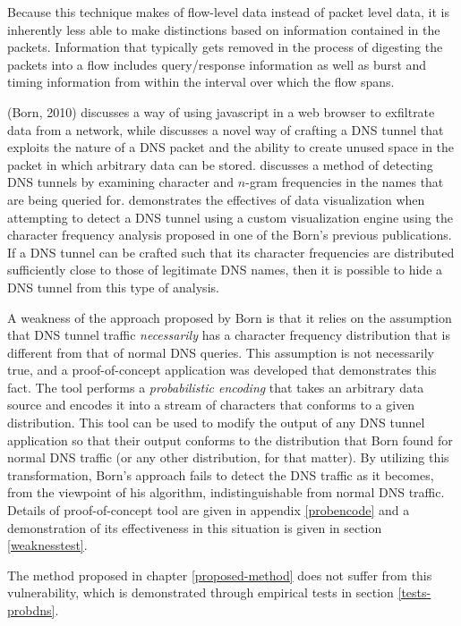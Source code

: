 \documentclass[12pt]{report}
\theoremstyle{remark}
\theoremstyle{definition}
\theoremstyle{definition}
\theoremstyle{definition}
\begin{document}
Because this technique makes of flow-level data instead of packet level data, it
is inherently less able to make distinctions based on information contained in
the packets. Information that typically gets removed in the process of digesting
the packets into a flow includes query/response information as well as burst and
timing information from within the interval over which the flow spans.

\label{litreview-dns-cfa} (Born, 2010)\cite{Born2010.exfil} discusses a way of
using javascript in a web browser to exfiltrate data from a network, while
\cite{Born2010.psudp} discusses a novel way of crafting a DNS tunnel that
exploits the nature of a DNS packet and the ability to create unused space in
the packet in which arbitrary data can be stored. \cite{Born2010.cfa} discusses
a method of detecting DNS tunnels by examining character and $n$-gram
frequencies in the names that are being queried for. \cite{Born2010.ngviz}
demonstrates the effectives of data visualization when attempting to detect a
DNS tunnel using a custom visualization engine using the character frequency
analysis proposed in one of the Born's previous publications. If a DNS tunnel
can be crafted such that its character frequencies are distributed sufficiently
close to those of legitimate DNS names, then it is possible to hide a DNS tunnel
from this type of analysis.

A weakness of the approach proposed by Born is that it relies on the assumption
that DNS tunnel traffic \emph{necessarily} has a character frequency
distribution that is different from that of normal DNS queries. This assumption
is not necessarily true, and a proof-of-concept application was developed that
demonstrates this fact. The tool performs a \emph{probabilistic encoding} that
takes an arbitrary data source and encodes it into a stream of characters that
conforms to a given distribution. This tool can be used to modify the output of
any DNS tunnel application so that their output conforms to the distribution
that Born found for normal DNS traffic (or any other distribution, for that
matter). By utilizing this transformation, Born's approach fails to detect the
DNS traffic as it becomes, from the viewpoint of his algorithm,
indistinguishable from normal DNS traffic. Details of proof-of-concept tool are
given in appendix \ref{probencode} and a demonstration of its effectiveness in
this situation is given in section \ref{weaknesstest}.

The method proposed in chapter \ref{proposed-method} does not suffer from this
vulnerability, which is demonstrated through empirical tests in section
\ref{tests-probdns}.
\end{document}
